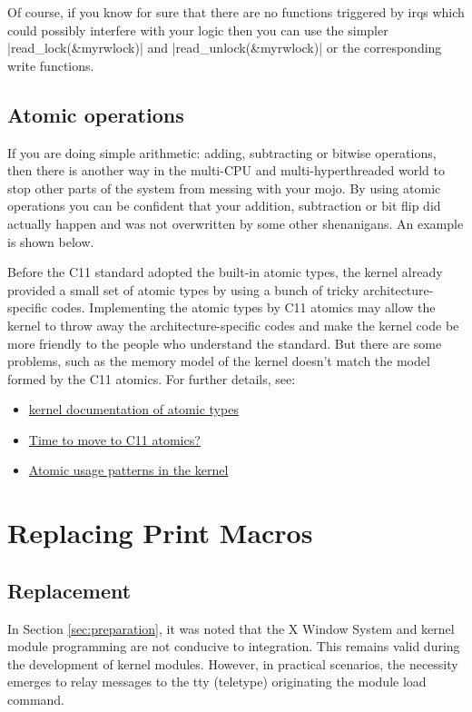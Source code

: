 \documentclass[10pt, oneside]{book}
\begin{document}

Of course, if you know for sure that there are no functions triggered by irqs which could possibly interfere with your logic then you can use the simpler \cpp|read_lock(&myrwlock)| and \cpp|read_unlock(&myrwlock)| or the corresponding write functions.
\subsection{Atomic operations}
\label{sec:atomics}
If you are doing simple arithmetic: adding, subtracting or bitwise operations, then there is another way in the multi-CPU and multi-hyperthreaded world to stop other parts of the system from messing with your mojo.
By using atomic operations you can be confident that your addition, subtraction or bit flip did actually happen and was not overwritten by some other shenanigans.
An example is shown below.


Before the C11 standard adopted the built-in atomic types, the kernel already provided a small set of atomic types by using a bunch of tricky architecture-specific codes.
Implementing the atomic types by C11 atomics may allow the kernel to throw away the architecture-specific codes and make the kernel code be more friendly to the people who understand the standard.
But there are some problems, such as the memory model of the kernel doesn't match the model formed by the C11 atomics.
For further details, see:
\begin{itemize}
 \item \href{https://www.kernel.org/doc/Documentation/atomic_t.txt}{kernel documentation of atomic types}
 \item \href{https://lwn.net/Articles/691128/}{Time to move to C11 atomics?}
 \item \href{https://lwn.net/Articles/698315/}{Atomic usage patterns in the kernel}
\end{itemize}

\section{Replacing Print Macros}
\label{sec:print_macros}
\subsection{Replacement}
In Section \ref{sec:preparation}, it was noted that the X Window System and kernel module programming are not conducive to integration.
This remains valid during the development of kernel modules.
However, in practical scenarios, the necessity emerges to relay messages to the tty (teletype) originating the module load command.
\end{document}
